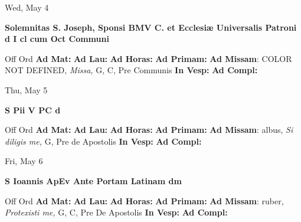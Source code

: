 \documentclass[10pt]{memoir}
\begin{document}
\begin{center}
\begin{minipage}{3.5in}
\vspace{2em}
\begin{center}Wed, May 4
\end{center}
\textbf{ \large Solemnitas S. Joseph, Sponsi BMV C. et Ecclesiæ Universalis Patroni
\textnormal{\normalsize d I cl cum Oct Communi}}

\begin{justify}Off Ord
\textbf{Ad Mat: }
\textbf{Ad Lau: }
\textbf{Ad Horas: }
\textbf{Ad Primam: }\textbf{Ad Missam}: COLOR NOT DEFINED, \textit{Missa,} G, C, Pre Communis
\textbf{In Vesp: }
\textbf{Ad Compl: }
\end{justify}
\end{minipage}
\end{center}

\begin{center}
\begin{minipage}{3.5in}
\vspace{2em}
\begin{center}Thu, May 5
\end{center}
\textbf{ \large S Pii V PC
\textnormal{\normalsize d}}

\begin{justify}Off Ord
\textbf{Ad Mat: }
\textbf{Ad Lau: }
\textbf{Ad Horas: }
\textbf{Ad Primam: }\textbf{Ad Missam}: albus, \textit{Si diligis me,} G, Pre de Apostolis
\textbf{In Vesp: }
\textbf{Ad Compl: }
\end{justify}
\end{minipage}
\end{center}

\begin{center}
\begin{minipage}{3.5in}
\vspace{2em}
\begin{center}Fri, May 6
\end{center}
\textbf{ \large S Ioannis ApEv Ante Portam Latinam
\textnormal{\normalsize dm}}

\begin{justify}Off Ord
\textbf{Ad Mat: }
\textbf{Ad Lau: }
\textbf{Ad Horas: }
\textbf{Ad Primam: }\textbf{Ad Missam}: ruber, \textit{Protexisti me,} G, C, Pre De Apostolis
\textbf{In Vesp: }
\textbf{Ad Compl: }
\end{justify}
\end{minipage}
\end{center}
\end{document}

